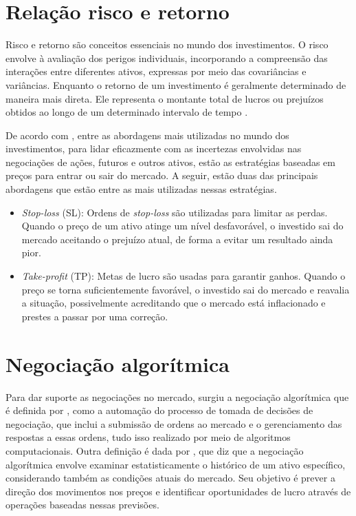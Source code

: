 \documentclass{iftex2024}
\begin{document}
\section{Relação risco e retorno}

Risco e retorno são conceitos essenciais no mundo dos investimentos. O risco
envolve à avaliação dos perigos individuais, incorporando a compreensão das interações
entre diferentes ativos, expressas por meio das covariâncias e variâncias. Enquanto o retorno
de um investimento é geralmente determinado de maneira mais direta. Ele representa o
montante total de lucros ou prejuízos obtidos ao longo de um determinado intervalo de
tempo \cite{NETORISCO}.

De acordo com \textcite{WOS:000231777300003}, entre as abordagens mais utilizadas
no mundo dos investimentos, para lidar eficazmente com as incertezas envolvidas nas
negociações de ações, futuros e outros ativos, estão as estratégias baseadas em preços para
entrar ou sair do mercado. A seguir, estão duas das principais abordagens que estão entre
as mais utilizadas nessas estratégias.

\begin{itemize}
  \item \textit{Stop-loss} (SL): Ordens de \textit{stop-loss} são utilizadas para limitar as perdas. Quando o
  preço de um ativo atinge um nível desfavorável, o investido sai do mercado aceitando
  o prejuízo atual, de forma a evitar um resultado ainda pior.
  \item \textit{Take-profit} (TP):  Metas de lucro são usadas para garantir ganhos. Quando o preço
  se torna suficientemente favorável, o investido sai do mercado e reavalia a situação,
  possivelmente acreditando que o mercado está inflacionado e prestes a passar por
  uma correção.
\end{itemize}

\section{Negociação algorítmica}

Para dar suporte as negociações no mercado, surgiu a negociação algorítmica que é definida por 
\textcite{hendershott2012algorithmic}, como a automação do processo
de tomada de decisões de negociação, que inclui a submissão de ordens ao mercado e o
gerenciamento das respostas a essas ordens, tudo isso realizado por meio de algoritmos
computacionais. Outra definição é dada por \textcite{portnoy2011high}, que diz que a negociação
algorítmica envolve examinar estatisticamente o histórico de um ativo específico, considerando 
também as condições atuais do mercado. Seu objetivo é prever a direção dos
movimentos nos preços e identificar oportunidades de lucro através de operações baseadas
nessas previsões.
\end{document}
